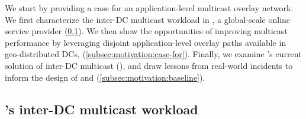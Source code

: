 We start by providing a case for an application-level multicast
overlay network. We first characterize the inter-DC multicast
workload in \company, a global-scale online service provider
(\Section\ref{subsec:motivation:multicast-traffic}). We then show
the opportunities of improving multicast performance by leveraging
disjoint application-level overlay paths available in geo-distributed
DCs,  (\Section\ref{subsec:motivation:case-for}). Finally, we examine \company's current solution of inter-DC multicast (\alg), and draw
lessons from real-world incidents to inform the design of \name and \newname
(\Section\ref{subsec:motivation:baseline}). 


\subsection{\company's inter-DC multicast workload}
\label{subsec:motivation:multicast-traffic}


